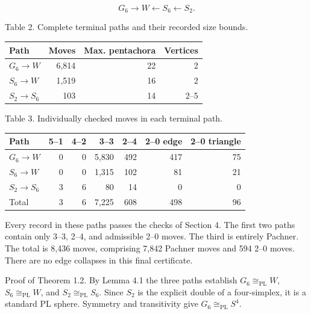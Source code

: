 \documentclass[11pt,letterpaper]{article}
\begin{document}
\[
G_6\longrightarrow W\longleftarrow S_6\longleftarrow S_2.
\]
\noindent\begin{minipage}{\linewidth}
\begin{center}\small
Table 2. Complete terminal paths and their recorded size bounds.\par\smallskip
\begin{tabular}{lrrr}
\toprule
\textbf{Path} & \textbf{Moves} & \textbf{Max. pentachora} & \textbf{Vertices} \\
\midrule
$G_6\to W$ & 6,814 & 22 & 2 \\
$S_6\to W$ & 1,519 & 16 & 2 \\
$S_2\to S_6$ & 103 & 14 & 2--5 \\
\bottomrule
\end{tabular}
\end{center}
\end{minipage}\par\smallskip
\noindent\begin{minipage}{\linewidth}
\begin{center}\small
Table 3. Individually checked moves in each terminal path.\par\smallskip
\begin{tabular}{lrrrrrr}
\toprule
\textbf{Path} & \textbf{5--1} & \textbf{4--2} & \textbf{3--3} & \textbf{2--4} & \textbf{2--0 edge} & \textbf{2--0 triangle} \\
\midrule
$G_6\to W$ & 0 & 0 & 5,830 & 492 & 417 & 75 \\
$S_6\to W$ & 0 & 0 & 1,315 & 102 & 81 & 21 \\
$S_2\to S_6$ & 3 & 6 & 80 & 14 & 0 & 0 \\
Total & 3 & 6 & 7,225 & 608 & 498 & 96 \\
\bottomrule
\end{tabular}
\end{center}
\end{minipage}\par\smallskip
Every record in these paths passes the checks of Section 4. The first two paths contain only 3--3, 2--4, and admissible 2--0 moves. The third is entirely Pachner. The total is 8,436 moves, comprising 7,842 Pachner moves and 594 2--0 moves. There are no edge collapses in this final certificate.

Proof of Theorem 1.2. By Lemma 4.1 the three paths establish $G_6\cong_{\mathrm{PL}}W$, $S_6\cong_{\mathrm{PL}}W$, and $S_2\cong_{\mathrm{PL}}S_6$. Since $S_2$ is the explicit double of a four-simplex, it is a standard PL sphere. Symmetry and transitivity give $G_6\cong_{\mathrm{PL}}S^4$.
\end{document}
